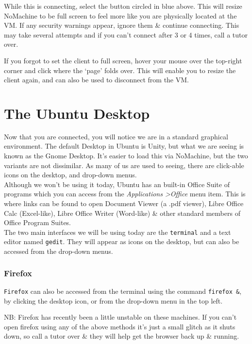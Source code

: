 \begin{warning}
While this is connecting, select the button circled in blue above.
This will resize NoMachine to be full screen to feel more like you are physically located at the VM.
If any security warnings appear, ignore them \& continue connecting.
This may take several attempts and if you can't connect after 3 or 4 times, call a tutor over.
\end{warning}

If you forgot to set the client to full screen, hover your mouse over the top-right corner and click where the `page' folds over. 
This will enable you to resize the client again, and can also be used to disconnect from the VM.\\


\section{The Ubuntu Desktop}
\begin{note}
Now that you are connected, you will notice we are in a standard graphical environment.
The default Desktop in Ubuntu is Unity, but what we are seeing is known as the Gnome Desktop.
It's easier to load this via NoMachine, but the two variants are not dissimilar.
As many of us are used to seeing, there are click-able icons on the desktop, and drop-down menus. \\

Although we won't be using it today, Ubuntu has an built-in Office Suite of
programs which you can access from the \textit{Applications \textgreater Office} menu item.
This is where links can be found to open Document Viewer (a .pdf viewer), Libre Office Calc (Excel-like), Libre Office Writer (Word-like) \& other standard members of Office Program Suites. \\

The two main interfaces we will be using today are the \texttt{terminal} and a text editor named \texttt{gedit}.
They will appear as icons on the desktop, but can also be accessed from the drop-down menus.
\end{note}

\subsubsection*{Firefox}

\texttt{Firefox} can also be accessed from the terminal using the command \texttt{firefox \&},  by clicking the desktop icon, or from the drop-down menu in the top left.

\begin{warning}
NB: Firefox has recently been a little unstable on these machines.
If you can't open firefox using any of the above methods it's just a small glitch as it shuts down, so call a tutor over \& they will help get the browser back up \& running.
\end{warning}